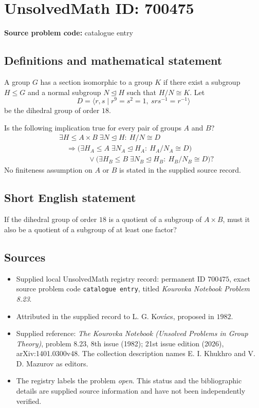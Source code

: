 \documentclass[11pt]{article}
\begin{document}
\section*{UnsolvedMath ID: 700475}
\textbf{Source problem code:} catalogue entry
\subsection{Definitions and mathematical statement}
A group \(G\) has a section isomorphic to a group \(K\) if there exist a subgroup \(H\leq G\) and a normal subgroup \(N\trianglelefteq H\) such that \(H/N\cong K\). Let
\[
D=\langle r,s\mid r^9=s^2=1,\ srs^{-1}=r^{-1}\rangle
\]
be the dihedral group of order \(18\).

Is the following implication true for every pair of groups \(A\) and \(B\)?
\[
\begin{aligned}
&\exists H\leq A\times B\;\exists N\trianglelefteq H:\ H/N\cong D\\
&\quad\Longrightarrow
\bigl(\exists H_A\leq A\;\exists N_A\trianglelefteq H_A:\ H_A/N_A\cong D\bigr)\\
&\qquad\qquad\lor
\bigl(\exists H_B\leq B\;\exists N_B\trianglelefteq H_B:\ H_B/N_B\cong D\bigr)?
\end{aligned}
\]
No finiteness assumption on \(A\) or \(B\) is stated in the supplied source record.
\subsection{Short English statement}
If the dihedral group of order \(18\) is a quotient of a subgroup of \(A\times B\), must it also be a quotient of a subgroup of at least one factor?
\subsection{Sources}
\begin{itemize}
\item Supplied local UnsolvedMath registry record: permanent ID \(700475\), exact source problem code \texttt{catalogue entry}, titled \emph{Kourovka Notebook Problem 8.23}.
\item Attributed in the supplied record to L. G. Kov\'acs, proposed in \(1982\).
\item Supplied reference: \emph{The Kourovka Notebook (Unsolved Problems in Group Theory)}, problem 8.23, 8th issue (1982); 21st issue edition (2026), arXiv:1401.0300v48. The collection description names E. I. Khukhro and V. D. Mazurov as editors.
\item The registry labels the problem \emph{open}. This status and the bibliographic details are supplied source information and have not been independently verified.
\end{itemize}
\end{document}
